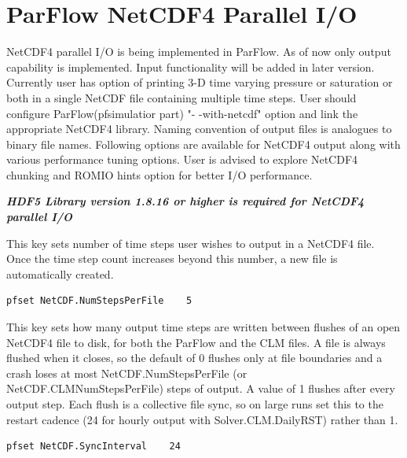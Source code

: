 \section{ParFlow NetCDF4 Parallel I/O}
\label{ParFlow NetCDF4 Parallel I/O}
NetCDF4 parallel I/O is being implemented in ParFlow. As of now only output capability is implemented. Input functionality will be added in later version. Currently user has option of printing 3-D time varying pressure or saturation or both in a single NetCDF file containing multiple time steps. User should configure ParFlow(pfsimulatior part) "- -with-netcdf" option and link the appropriate NetCDF4 library.
Naming convention of output files is analogues to binary file names. Following options are available for NetCDF4 output along with various performance tuning options. User is advised to explore NetCDF4 chunking and ROMIO hints option for better I/O performance.

\textbf{\textit{HDF5 Library version 1.8.16 or higher is required for NetCDF4 parallel I/O}}

{This key sets number of time steps user wishes to output in a NetCDF4 file. Once the time step count increases beyond this number, a new file is automatically created.}
\begin{display}\begin{verbatim}
pfset NetCDF.NumStepsPerFile    5
\end{verbatim}\end{display}

{This key sets how many output time steps are written between flushes of an open NetCDF4 file to disk, for both the ParFlow and the CLM files. A file is always flushed when it closes, so the default of 0 flushes only at file boundaries and a crash loses at most NetCDF.NumStepsPerFile (or NetCDF.CLMNumStepsPerFile) steps of output. A value of 1 flushes after every output step. Each flush is a collective file sync, so on large runs set this to the restart cadence (24 for hourly output with Solver.CLM.DailyRST) rather than 1.}
\begin{display}\begin{verbatim}
pfset NetCDF.SyncInterval    24
\end{verbatim}\end{display}

